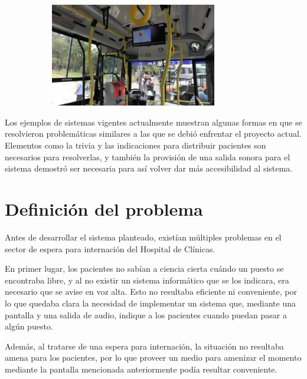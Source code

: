 \documentclass{article}
\begin{document}
\begin{figure}[H]
	\caption{Colectivo con pantalla que muestra información relevante}
    \begin{subfigure}{1.0\textwidth}
	\includegraphics[width=0.8\textwidth]{colectivo.png}
    \end{subfigure}
	\label{fig:colectivo}
\end{figure}
\vspace{-1.0\baselineskip}
Los ejemplos de sistemas vigentes actualmente muestran algunas formas en que se resolvieron problemáticas similares a las que se debió enfrentar el proyecto actual. Elementos como la trivia y las indicaciones para distribuir pacientes son necesarios para resolverlas, y también la provisión de una salida sonora para el sistema demostró ser necesaria para así volver dar más accesibilidad al sistema.
\newpage
\section{Definición del problema}
Antes de desarrollar el sistema planteado, existían múltiples problemas en el sector de espera para internación del Hospital de Clínicas.

En primer lugar, los pacientes no sabían a ciencia cierta cuándo un puesto se encontraba libre, y al no existir un sistema informático que se los indicara, era necesario que se avise en voz alta. Esto no resultaba eficiente ni conveniente, por lo que quedaba clara la necesidad de implementar un sistema que, mediante una pantalla y una salida de audio, indique a los pacientes cuando puedan pasar a algún puesto.

Además, al tratarse de una espera para internación, la situación no resultaba amena para los pacientes, por lo que proveer un medio para amenizar el momento mediante la pantalla mencionada anteriormente podía resultar conveniente.
\end{document}

